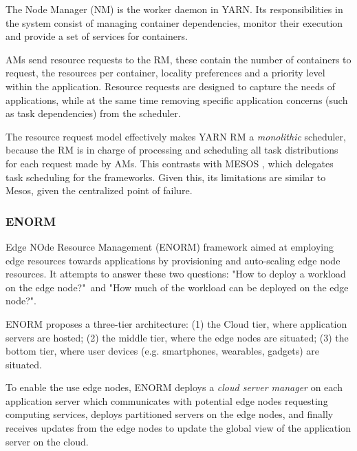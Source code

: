 The Node Manager (NM) is the worker daemon in YARN. Its responsibilities in the system consist of managing container dependencies, monitor their execution and provide a set of services for containers. 

AMs send resource requests to the RM, these contain the number of containers to request, the resources per container, locality preferences and a priority level within the application. Resource requests are designed to capture the needs of applications, while at the same time removing specific application concerns (such as task dependencies) from the scheduler.

The resource request model effectively makes YARN RM a \textit{monolithic} scheduler, because the RM is in charge of processing and scheduling all task distributions for each request made by AMs. This contrasts with MESOS \cite{hindman2011mesos}, which delegates task scheduling for the frameworks. Given this, its limitations are similar to Mesos, given the centralized point of failure.


\subsubsection{ENORM}

Edge NOde Resource Management \cite{wang2017enorm} (ENORM) framework aimed at employing edge resources towards applications by provisioning and auto-scaling edge node resources. It attempts to answer these two questions: "How to deploy a workload on the edge node?"\ and "How much of the workload can be deployed on the edge node?".

ENORM proposes a three-tier architecture: (1) the Cloud tier, where application servers are hosted; (2) the middle tier, where the edge nodes are situated; (3) the bottom tier, where user devices (e.g. smartphones, wearables, gadgets) are situated. 

To enable the use edge nodes, ENORM deploys a \textit{cloud server manager} on each application server which communicates with potential edge nodes requesting computing services, deploys partitioned servers on the edge nodes, and finally receives updates from the edge nodes to update the global view of the application server on the cloud.


